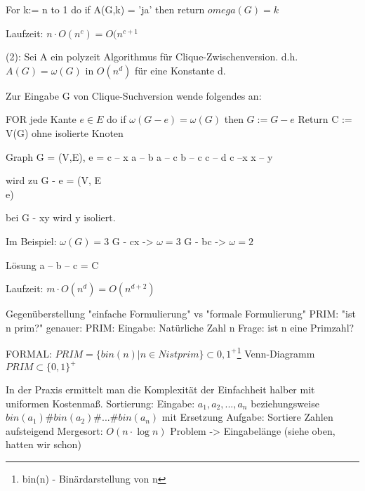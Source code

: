 \documentclass{article} %
\begin{document}
\begin{framed}
For k:= n to 1 do
	if A(G,k) = 'ja'
	then return $omega (G) = k $
\end{framed}
Laufzeit: $n \cdot O(n^c) = O(n^{c+1}$


(2): Sei A ein polyzeit Algorithmus für Clique-Zwischenversion.
d.h. $A(G) = \omega (G)$ in $O(n^d)$ für eine Konstante d.

Zur Eingabe G von Clique-Suchversion wende folgendes an:
\begin{framed}
FOR jede Kante $e \in E$ do
	if $\omega (G - e ) = \omega (G)$
	then $G := G - e$
Return C := V(G) ohne isolierte Knoten
\end{framed}

Graph G = (V,E), e = c -- x
a -- b
a -- c
b -- c
c -- d
c --x %
x -- y

wird zu G - e = (V, E \\ {e})

bei G - xy wird y isoliert.

Im Beispiel: $\omega (G) = 3$
G - cx -> $\omega = 3$
G - bc -> $\omega = 2$


Lösung a -- b -- c = C

Laufzeit: $m \cdot O(n^d) = O(n^{d+2})$

Gegenüberstellung "einfache Formulierung" vs "formale Formulierung"
PRIM: "ist n prim?"
genauer: 
PRIM:
Eingabe: Natürliche Zahl n
Frage: ist n eine Primzahl?

FORMAL: $PRIM = \{ bin(n) |  n \in N ist prim\} \subset {0,1}^+$\footnote{bin(n) - Binärdarstellung von n}
Venn-Diagramm $PRIM \subset \{0,1\}^+$

In der Praxis ermittelt man die Komplexität der Einfachheit halber mit uniformen Kostenmaß.
Sortierung:
Eingabe: $a_1, a_2,...,a_n$ beziehungsweise $bin(a_1) \# bin(a_2) \# ... \# bin(a_n) $ mit Ersetzung 
Aufgabe: Sortiere Zahlen aufsteigend
Mergesort: $O(n \cdot \log n)$
Problem -> Eingabelänge (siehe oben, hatten wir schon)




\end{document}
